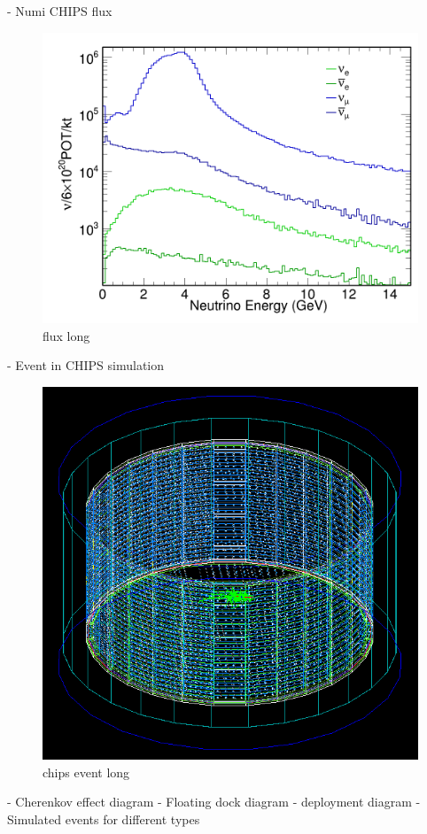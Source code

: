 - Numi CHIPS flux
\begin{figure}
    \includegraphics[width=\textwidth]{diagrams/4-chips/flux.png}
    \caption[flux short]{flux long}
    \label{fig:flux}
\end{figure}
- Event in CHIPS simulation
\begin{figure}
    \includegraphics[width=\textwidth]{diagrams/4-chips/chips_event.png}
    \caption[chips event short]{chips event long}
    \label{fig:chips_event}
\end{figure}
- Cherenkov effect diagram
- Floating dock diagram
- deployment diagram
- Simulated events for different types


